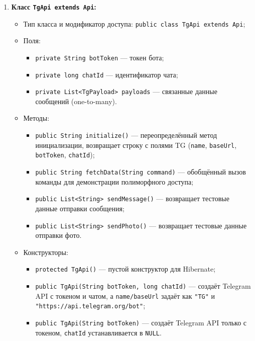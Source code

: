 \documentclass[11pt,a4paper]{article}
\begin{document}
\begin{enumerate}
    \item \textbf{Класс \texttt{TgApi extends Api}:}
    \begin{itemize}
        \item Тип класса и модификатор доступа: \texttt{public class TgApi extends Api};
        \item Поля:
        \begin{itemize}
            \item \texttt{private String botToken} --- токен бота;
            \item \texttt{private long chatId} --- идентификатор чата;
            \item \texttt{private List<TgPayload> payloads} --- связанные данные сообщений (one-to-many).
        \end{itemize}
        \item Методы:
        \begin{itemize}
            \item \texttt{public String initialize()} --- переопределённый метод инициализации, возвращает строку с полями TG (\texttt{name}, \texttt{baseUrl}, \texttt{botToken}, \texttt{chatId});
            \item \texttt{public String fetchData(String command)} --- обобщённый вызов команды для демонстрации полиморфного доступа;
            \item \texttt{public List<String> sendMessage()} --- возвращает тестовые данные отправки сообщения;
            \item \texttt{public List<String> sendPhoto()} --- возвращает тестовые данные отправки фото.
        \end{itemize}
        \item Конструкторы:
        \begin{itemize}
            \item \texttt{protected TgApi()} --- пустой конструктор для Hibernate;
            \item \texttt{public TgApi(String botToken, long chatId)} --- создаёт Telegram API с токеном и чатом, а \texttt{name/baseUrl} задаёт как \texttt{"TG"} и \texttt{"https://api.telegram.org/bot"};
            \item \texttt{public TgApi(String botToken)} --- создаёт Telegram API только с токеном, \texttt{chatId} устанавливается в \texttt{NULL}.
        \end{itemize}
    \end{itemize}


\end{enumerate}
\end{document}
